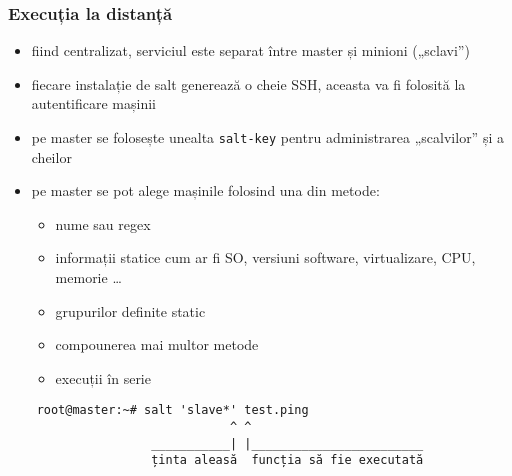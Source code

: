 \documentclass[compress]{beamer}
\begin{document}
\begin{frame}
\frametitle{Execuția la distanță}

\begin{itemize}[<+->]
  \item fiind centralizat, serviciul este separat între master și minioni („sclavi”)
  \item fiecare instalație de salt generează o cheie SSH, aceasta va fi folosită la autentificare mașinii
  \item pe master se folosește unealta \texttt{salt-key} pentru administrarea „scalvilor” și a cheilor
  \item pe master se pot alege mașinile folosind una din metode: 
    \begin{itemize}
        \item nume sau regex
        \item informații statice cum ar fi SO, versiuni software, virtualizare, CPU, memorie \ldots
        \item grupurilor definite static
        \item compounerea mai multor metode
        \item execuții în serie
    \end{itemize}
\end{itemize}
\end{frame}

\begin{frame}[fragile]
  \begin{center}
    \begin{verbatim}
    root@master:~# salt 'slave*' test.ping
                               ^ ^
                    ___________| |________________________
                    ținta aleasă  funcția să fie executată
    \end{verbatim}
  \end{center}
\end{frame}
\end{document}
